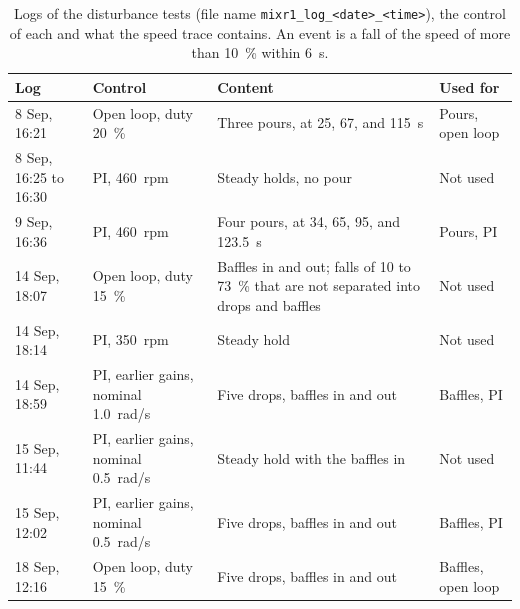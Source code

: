 \begin{table}[htbp]
    \centering
    \caption[Candidate disturbance logs]{Logs of the disturbance tests (file name \texttt{mixr1\_log\_<date>\_<time>}), the control of each and what the speed trace contains. An event is a fall of the speed of more than 10~\% within 6~s.}
    \label{tab:dist-runs}
    \small
    \begin{tabular}{@{}p{2.6cm}p{2.5cm}p{6.3cm}p{2.4cm}@{}}
        \toprule
        Log & Control & Content & Used for \\
        \midrule
        8 Sep, 16:21 & Open loop, duty 20~\% & Three pours, at 25, 67, and 115~s & Pours, open loop \\
        8 Sep, 16:25 to 16:30 & PI, 460~rpm & Steady holds, no pour & Not used \\
        9 Sep, 16:36 & PI, 460~rpm & Four pours, at 34, 65, 95, and 123.5~s & Pours, PI \\
        14 Sep, 18:07 & Open loop, duty 15~\% & Baffles in and out; falls of 10 to 73~\% that are not separated into drops and baffles & Not used \\
        14 Sep, 18:14 & PI, 350~rpm & Steady hold & Not used \\
        14 Sep, 18:59 & PI, earlier gains, nominal 1.0~rad/s & Five drops, baffles in and out & Baffles, PI \\
        15 Sep, 11:44 & PI, earlier gains, nominal 0.5~rad/s & Steady hold with the baffles in & Not used \\
        15 Sep, 12:02 & PI, earlier gains, nominal 0.5~rad/s & Five drops, baffles in and out & Baffles, PI \\
        18 Sep, 12:16 & Open loop, duty 15~\% & Five drops, baffles in and out & Baffles, open loop \\
        \bottomrule
    \end{tabular}
\end{table}

